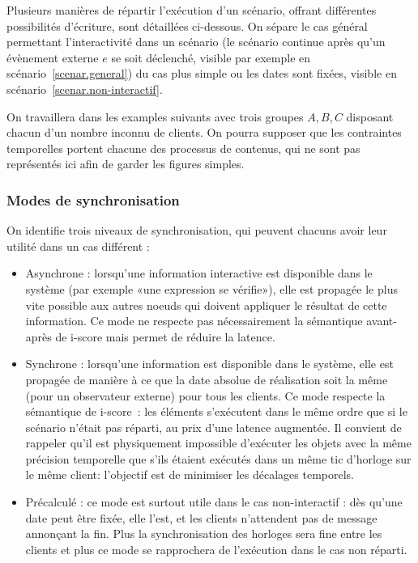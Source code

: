 \documentclass{article}
\begin{document}
Plusieurs manières de répartir l'exécution d'un scénario, offrant différentes possibilités d'écriture, sont détaillées ci-dessous. On sépare le cas général permettant l'interactivité dans un scénario (le scénario continue après qu'un évènement externe $e$ se soit déclenché, visible par exemple en scénario~\ref{scenar.general}) du cas plus simple ou les dates sont fixées, visible en scénario~\ref{scenar.non-interactif}.

On travaillera dans les examples suivants avec trois groupes $A,B,C$ disposant chacun d'un nombre inconnu de clients. 
On pourra supposer que les contraintes temporelles portent chacune des processus de contenus, qui ne sont pas représentés ici afin de garder les figures simples.

\subsubsection{Modes de synchronisation}
On identifie trois niveaux de synchronisation, qui peuvent chacuns avoir leur utilité dans un cas différent : 
\begin{itemize}
    \item Asynchrone : lorsqu'une information interactive est disponible dans le système (par exemple «une expression se vérifie»), elle est propagée le plus vite possible aux autres noeuds qui doivent appliquer le résultat de cette information. Ce mode ne respecte pas nécessairement la sémantique avant-après de i-score mais permet de réduire la latence.
    \item Synchrone : lorsqu'une information est disponible dans le système, elle est propagée de manière à ce que la date absolue de réalisation soit  la même (pour un observateur externe) pour tous les clients. 
    Ce mode respecte la sémantique de i-score~: les éléments s'exécutent dans le même ordre que si le scénario n'était pas réparti, au prix d'une latence augmentée.    
    Il convient de rappeler qu'il est physiquement impossible d'exécuter les objets avec la même précision temporelle que s'ils étaient exécutés dans un même tic d'horloge sur le même client: l'objectif est de minimiser les décalages temporels.
    \item Précalculé : ce mode est surtout utile dans le cas non-interactif : dès qu'une date peut être fixée, elle l'est, et les clients n'attendent pas de message annonçant la fin. 
    Plus la synchronisation des horloges sera fine entre les clients et plus ce mode se rapprochera de l'exécution dans le cas non réparti.
\end{itemize}
\end{document}
